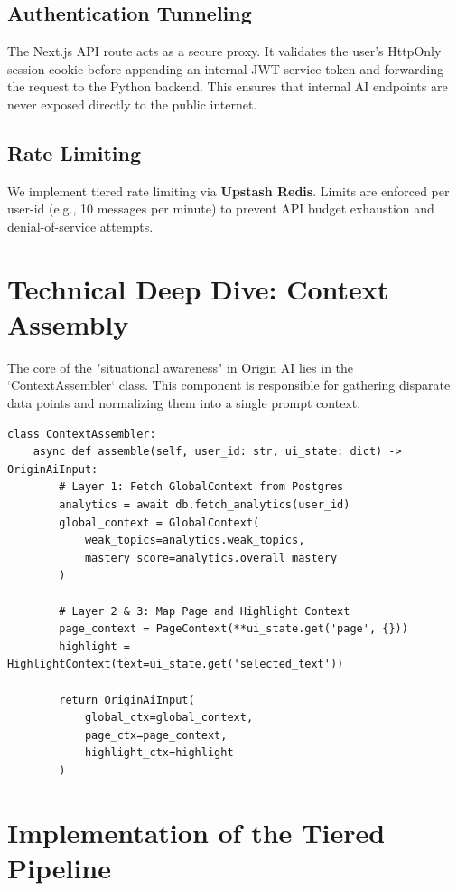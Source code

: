 \subsection{Authentication Tunneling}
The Next.js API route acts as a secure proxy. It validates the user's HttpOnly session cookie before appending an internal JWT service token and forwarding the request to the Python backend. This ensures that internal AI endpoints are never exposed directly to the public internet.

\subsection{Rate Limiting}
We implement tiered rate limiting via \textbf{Upstash Redis}. Limits are enforced per user-id (e.g., 10 messages per minute) to prevent API budget exhaustion and denial-of-service attempts.

\section{Technical Deep Dive: Context Assembly}

The core of the "situational awareness" in Origin AI lies in the `ContextAssembler` class. This component is responsible for gathering disparate data points and normalizing them into a single prompt context.

\begin{verbatim}
class ContextAssembler:
    async def assemble(self, user_id: str, ui_state: dict) -> OriginAiInput:
        # Layer 1: Fetch GlobalContext from Postgres
        analytics = await db.fetch_analytics(user_id)
        global_context = GlobalContext(
            weak_topics=analytics.weak_topics,
            mastery_score=analytics.overall_mastery
        )
        
        # Layer 2 & 3: Map Page and Highlight Context
        page_context = PageContext(**ui_state.get('page', {}))
        highlight = HighlightContext(text=ui_state.get('selected_text'))
        
        return OriginAiInput(
            global_ctx=global_context,
            page_ctx=page_context,
            highlight_ctx=highlight
        )
\end{verbatim}

\section{Implementation of the Tiered Pipeline}

